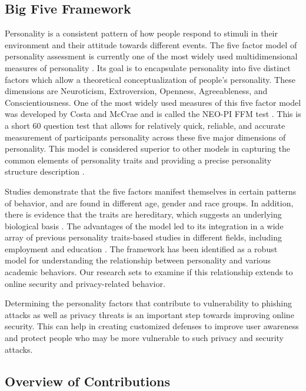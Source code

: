 \documentclass{sig-alternate}
\begin{document}
\subsection{Big Five Framework}
Personality is a consistent pattern of how people respond to stimuli in 
their
environment and their attitude towards different events.
The five factor model of personality assessment is currently one of the most widely used multidimensional measures of personality \cite{MJ92}.
Its goal is to encapsulate personality into five distinct factors which allow a theoretical conceptualization of people's personality. These dimensions are Neuroticism, Extroversion, Openness, Agreeableness, and Conscientiousness. One of the most widely used measures of this five factor model was developed by Costa and McCrae and is called the NEO-PI FFM test \cite{CM92b}. This is a short 60 question test that allows for relatively quick, reliable, and accurate measurement of participants personality across these five major dimensions of personality.
This model is considered superior to other models in capturing the common elements of personality traits and providing a precise personality structure description \cite{W04}. 

Studies demonstrate that the five factors manifest themselves in certain patterns of behavior, and are found in different age, gender and race groups. In addition, there is evidence that the traits are hereditary, which suggests an underlying biological basis \cite{CM92}.
The advantages of the model led to its integration in a wide array of previous personality traits-based studies 
in different fields, including employment \cite{RC03} and education \cite{BPE99}.
The 
framework has 
been identified as a robust model for understanding the relationship between personality and various academic behaviors. 
Our research sets to examine if this relationship extends to online security and privacy-related behavior. 

Determining the personality factors that contribute to vulnerability to phishing attacks as well as privacy threats is an important step towards improving online security. This can help in creating customized defenses to improve user awareness and protect people who may be more vulnerable to such privacy and security attacks. 






\subsection{Overview of Contributions}
\end{document}
